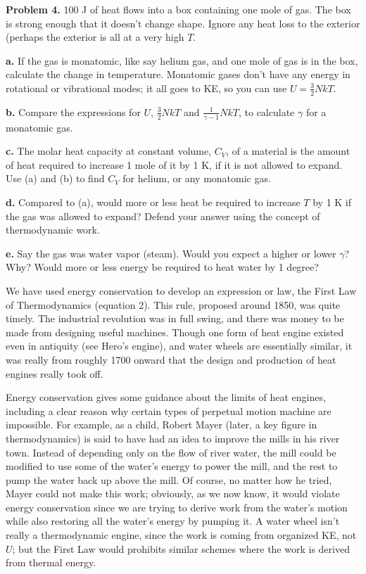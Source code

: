 \documentclass[12pt]{article}
\begin{document}
\textbf{Problem 4.}  100 J of heat flows into a box containing one mole of gas. The box is strong enough that it doesn't change shape. Ignore any heat loss to the exterior (perhaps the exterior is all at a very high $T$. 

\textbf{a.} If the gas is monatomic, like say helium gas, and one mole of gas is in the box, calculate the change in temperature. Monatomic gases don't have any energy in rotational or vibrational modes; it all goes to KE, so you can use $U=\frac{3}{2}NkT$.

\textbf{b.} Compare the expressions for $U$, $\frac{3}{2}NkT$ and $\frac{1}{\gamma-1}NkT$, to calculate $\gamma$ for a monatomic gas.

\textbf{c.} The molar heat capacity at constant volume, $C_V$, of a material is the amount of heat required to increase 1 mole of it by 1 K, if it is not allowed to expand. Use (a) and (b) to find $C_V$ for helium, or any monatomic gas.

\textbf{d.} Compared to (a), would more or less heat be required to increase $T$ by 1 K if the gas was allowed to expand? Defend your answer using the concept of thermodynamic work.

\textbf{e.} Say the gas was water vapor (steam). Would you expect a higher or lower $\gamma$? Why? Would more or less energy be required to heat water by 1 degree?

We have used energy conservation to develop an expression or law, the First Law of Thermodynamics (equation 2). This rule, proposed around 1850, was quite timely. The industrial revolution was in full swing, and there was money to be made from designing useful machines. Though one form of heat engine existed even in antiquity (see Hero's engine), and water wheels are essentially similar, it was really from roughly 1700 onward that the design and production of heat engines really took off. 

Energy conservation gives some guidance about the limits of heat engines, including a clear reason why certain types of perpetual motion machine are impossible. For example, as a child, Robert Mayer (later, a key figure in thermodynamics) is said to have had an idea to improve the mills in his river town. Instead of depending only on the flow of river water, the mill could be modified to use some of the water's energy to power the mill, and the rest to pump the water back up above the mill. Of course, no matter how he tried, Mayer could not make this work; obviously, as we now know, it would violate energy conservation since we are trying to derive work from the water's motion while also restoring all the water's energy by pumping it. A water wheel isn't really a thermodynamic engine, since the work is coming from organized KE, not $U$; but the First Law would prohibits similar schemes where the work is derived from thermal energy.
\end{document}
